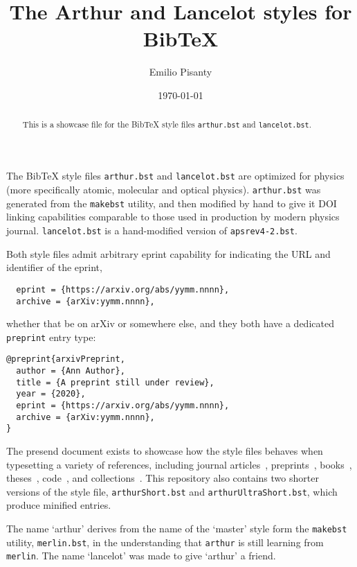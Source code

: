 \documentclass[%
  reprint,
  aps,
  pra,
  superscriptaddress,
  a4paper
]{revtex4-2}
\begin{document}
\title{The Arthur and Lancelot styles for BibTeX}

\author{Emilio Pisanty}

\date{\today}

\begin{abstract}
This is a showcase file for the BibTeX style files \texttt{arthur.bst} and \texttt{lancelot.bst}.
\end{abstract}

\maketitle

The BibTeX style files \texttt{arthur.bst} and \texttt{lancelot.bst} are optimized for physics (more specifically atomic, molecular and optical physics). 
\texttt{arthur.bst} was generated from the \texttt{makebst} utility, and then modified by hand to give it DOI linking capabilities comparable to those used in production by modern physics journal.
\texttt{lancelot.bst} is a hand-modified version of \texttt{apsrev4-2.bst}.

Both style files admit arbitrary eprint capability for indicating the URL and identifier of the eprint,
\begin{verbatim}
  eprint = {https://arxiv.org/abs/yymm.nnnn},
  archive = {arXiv:yymm.nnnn},
\end{verbatim}
whether that be on arXiv or somewhere else, and they both have a dedicated \texttt{preprint} entry type:
\begin{verbatim}
@preprint{arxivPreprint,
  author = {Ann Author},
  title = {A preprint still under review},
  year = {2020},
  eprint = {https://arxiv.org/abs/yymm.nnnn},
  archive = {arXiv:yymm.nnnn},
}  
\end{verbatim}

The presend document exists to showcase how the style files behaves when typesetting a variety of references, including
journal articles~\cite{journalArticle, journalArticle2},
preprints~\cite{arxivPreprint}, 
books~\cite{bookExample}, 
theses~\cite{thesisExample}, 
code~\cite{codeExample}, and
collections~\cite{collectionExample}.
This repository also contains two shorter versions of the style file, \texttt{arthurShort.bst} and \texttt{arthurUltraShort.bst}, which produce minified entries.


The name `arthur' derives from the name of the `master' style form the \texttt{makebst} utility, \texttt{merlin.bst}, in the understanding that \texttt{arthur} is still learning from \texttt{merlin}.
The name `lancelot' was made to give `arthur' a friend.
\end{document}
